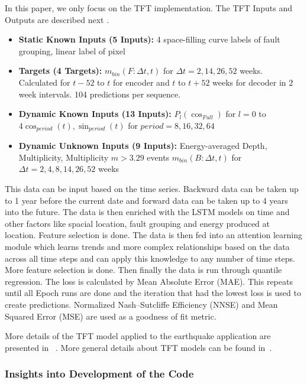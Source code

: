 \documentclass[utf8]{FrontiersinVancouver} %
\begin{document}
In this paper, we only focus on the TFT implementation. The TFT Inputs and Outputs are described next \cite{fox2022-jm}.

\begin{itemize}
\item {\bf Static Known Inputs (5 Inputs):} 4 space-filling curve
  labels of fault grouping, linear label of pixel
  \item {\bf Targets (4 Targets):} $m_{bin} (F:\Delta t,t)$ for $\Delta t = 2, 14, 26, 52$ weeks. Calculated for $t-52$ to $t$ for encoder and $t$ to $t+52$ weeks for decoder in $2$ week intervals. 104 predictions per sequence.
  \item {\bf Dynamic Known Inputs (13 Inputs):} $P_l(\cos_{Full})$ for $l=0$ to $4 \cos_{period}(t), \sin_{period}(t)$  for $period = 8, 16, 32, 64$
  \item {\bf Dynamic Unknown Inputs (9 Inputs):} Energy-averaged Depth, Multiplicity, Multiplicity  $m>3.29$ events $m_{bin} (B:\Delta t,t)$ for $\Delta t = 2, 4, 8, 14, 26, 52$ weeks
\end{itemize}


This data can be input based on the time series. Backward data can be taken up to 1 year before the current date and forward data can be taken up to 4 years into the future. The data is then enriched with the LSTM models on time and other factors like spacial location, fault grouping and energy produced at location. Feature selection is done. The data is then fed into an attention learning module which learns trends and more complex relationships based on the data across all time steps and can apply this knowledge to any number of time steps. More feature selection is done. Then finally the data is run through quantile regression. The loss is calculated by Mean Absolute Error (MAE). This repeats until all Epoch runs are done and the iteration that had the lowest loss is used to create predictions. Normalized Nash–Sutcliffe Efficiency (NNSE) and Mean Squared Error (MSE) are used as a goodness of fit metric.

More details of the TFT model applied to the earthquake application are presented in ~\citep{fox2022-jm}. More general details about TFT models can be found in~\citep{TFT-21}.



\subsubsection{Insights into Development of the Code}
\end{document}
